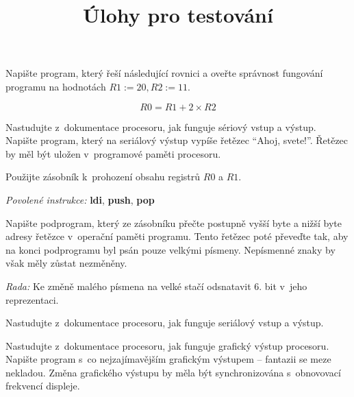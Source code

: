 \documentclass[a4,12pt]{exam}
\title{Úlohy pro testování}
\author{}
\date{}
\begin{document}
\maketitle

\begin{questions}
	
	
	Napište program, který řeší následující rovnici a oveřte správnost fungování programu na hodnotách \( R1 := 20, R2 := 11 \).
	
	\[ R0 = R1 + 2 \times R2 \]
	
	
	Nastudujte z~dokumentace procesoru, jak funguje sériový vstup a výstup. Napište program, který na seriálový výstup vypíše řetězec ``Ahoj, svete!''. Řetězec by měl být uložen v~programové paměti procesoru.
	
	
	Použijte zásobník k~prohození obsahu registrů \(R0\) a \(R1\).
	
	\textit{Povolené instrukce:} \textbf{ldi}, \textbf{push}, \textbf{pop}
	
	
	Napište podprogram, který ze zásobníku přečte postupně vyšší byte a nižší byte adresy řetězce v~operační paměti programu. Tento řetězec poté převeďte tak, aby na konci podprogramu byl psán pouze velkými písmeny. Nepísmenné znaky by však měly zůstat nezměněny.
	
	\textit{Rada:} Ke změně malého písmena na velké stačí odsnatavit 6. bit v~jeho reprezentaci.
	
	
	Nastudujte z~dokumentace procesoru, jak funguje seriálový vstup a výstup.
	

	
	Nastudujte z~dokumentace procesoru, jak funguje grafický výstup procesoru. Napište program s~co nejzajímavějším grafickým výstupem -- fantazii se meze nekladou. Změna grafického výstupu by měla být synchronizována s~obnovovací frekvencí displeje.
	
\end{questions}
\end{document}
